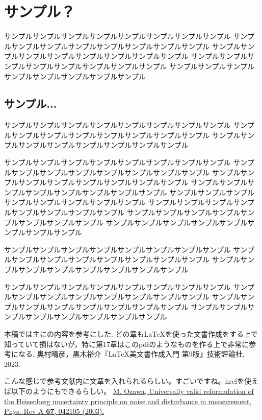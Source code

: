 \section{サンプル？}
サンプルサンプルサンプルサンプルサンプルサンプルサンプルサンプル
サンプルサンプルサンプルサンプルサンプルサンプルサンプルサンプル
サンプルサンプルサンプルサンプルサンプルサンプルサンプルサンプル
サンプルサンプルサンプルサンプルサンプルサンプルサンプルサンプル
サンプルサンプルサンプルサンプルサンプルサンプルサンプルサンプル
\subsection{サンプル...}
サンプルサンプルサンプルサンプルサンプルサンプルサンプルサンプル
サンプルサンプルサンプルサンプルサンプルサンプルサンプルサンプル
サンプルサンプルサンプルサンプルサンプルサンプルサンプルサンプル


サンプルサンプルサンプルサンプルサンプルサンプルサンプルサンプル
サンプルサンプルサンプルサンプルサンプルサンプルサンプルサンプル
サンプルサンプルサンプルサンプルサンプルサンプルサンプルサンプル
サンプルサンプルサンプルサンプルサンプルサンプルサンプルサンプル
サンプルサンプルサンプルサンプルサンプルサンプルサンプルサンプル
サンプルサンプルサンプルサンプルサンプルサンプルサンプルサンプル
サンプルサンプルサンプルサンプルサンプルサンプルサンプルサンプル
サンプルサンプルサンプルサンプルサンプルサンプルサンプルサンプル


サンプルサンプルサンプルサンプルサンプルサンプルサンプルサンプル
サンプルサンプルサンプルサンプルサンプルサンプルサンプルサンプル
サンプルサンプルサンプルサンプルサンプルサンプルサンプルサンプル

サンプルサンプルサンプルサンプルサンプルサンプルサンプルサンプル
サンプルサンプルサンプルサンプルサンプルサンプルサンプルサンプル
サンプルサンプルサンプルサンプルサンプルサンプルサンプルサンプル
サンプルサンプルサンプルサンプルサンプルサンプルサンプルサンプル

\let\oldaddcontentsline\addcontentsline %
\renewcommand{\addcontentsline}[3]{} %
\begin{thebibliography}{99}
\item[]本稿では主に\cite{bibunsho}の内容を参考にした. 
どの章も\LaTeX を使った文書作成をする上で知っていて損はないが，特に第17章はこのpdfのようなものを作る上で非常に参考になる. 
奥村晴彦，黒木裕介『\LaTeX 美文書作成入門 第9版』技術評論社, 2023.
\item[] こんな感じで参考文献内に文章を入れられるらしい。すごいですね。hrefを使えば以下のようにもできるらしい。
\href{https://journals.aps.org/pra/abstract/10.1103/PhysRevA.67.042105}{M. Ozawa, Universally valid reformulation of the Heisenberg uncertainty principle on noise and  disturbance in measurement, Phys. Rev A \textbf{67}, 042105 (2003).}
\end{thebibliography}
\let\addcontentsline\oldaddcontentsline %